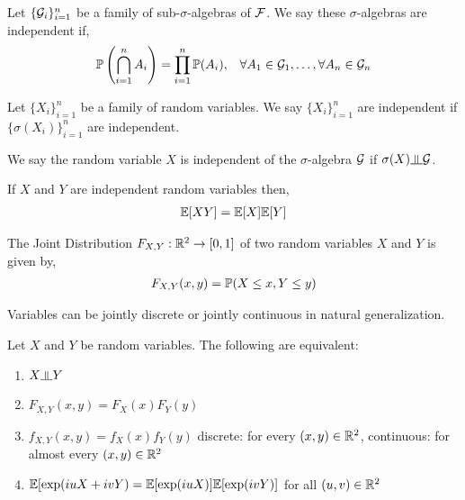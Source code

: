 \documentclass[12pt]{article}
\begin{document}
\begin{definition}
Let \( \{\mathcal{G}_i\}_{i=1}^{n} \) be a family of sub-\(\sigma\)-algebras of \( \mathcal{F} \). We say these \( \sigma \)-algebras are independent if,
\begin{align*}
    \mathbb{P}\left(\bigcap_{i=1}^{n} A_i\right) = \prod_{i=1}^n\mathbb{P}(A_i), && \forall A_1\in \mathcal{G}_1, \ldots, \forall A_n\in\mathcal{G}_n
\end{align*}
\end{definition}

\begin{definition}
Let \( \{X_i\}_{i=1}^{n} \) be a family of random variables. We say \( \{X_i\}_{i=1}^{n} \) are independent if \( \{ \sigma(X_i) \}_{i=1}^{n} \) are independent.

We say the random variable \( X \) is independent of the \( \sigma \)-algebra \( \mathcal{G} \) if \( \sigma(X) \indep \cG \).
\end{definition}

\begin{lemma}
If \( X \) and \( Y \) are independent random variables then,
\begin{align*}
    \mathbb{E}[ XY ] = \mathbb{E}[X]\mathbb{E}[Y]
\end{align*}
\end{lemma}

\begin{definition}
The Joint Distribution \( F_{X,Y} : \mathbb{R}^2 \to [0,1] \) of two random variables \( X \) and \( Y \) is given by,
\begin{align*}
    F_{X,Y}(x,y) = \mathbb{P}(X\leq x, Y\leq y)
\end{align*}
\end{definition}

Variables can be jointly discrete or jointly continuous in natural generalization.

\begin{theorem}
Let \( X \) and \( Y \) be random variables. The following are equivalent:
\begin{enumerate}[nolistsep]
    \item \( X\indep Y \)
    \item \( F_{X,Y}(x,y) = F_X(x)F_Y(y) \)
    \item \( f_{X,Y}(x,y) = f_X(x)f_Y(y) \) discrete: for every \( (x,y)\in \mathbb{R}^2 \), continuous: for almost every \( (x,y)\in \mathbb{R}^2 \)
    \item \( \mathbb{E}[\exp(iuX+ivY) = \mathbb{E}[\exp(iuX)]\mathbb{E}[\exp(ivY)] \) for all \( (u,v)\in\mathbb{R}^2 \)
\end{enumerate}
\end{theorem}
\end{document}
